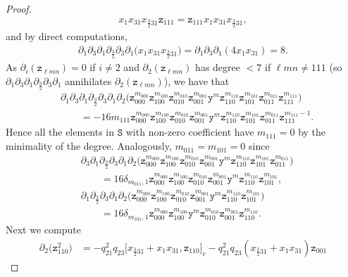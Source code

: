 \documentclass[10pt,a4paper]{amsart}
\numberwithin{equation}{section}
\newcommand{\yt}{\mathtt{y}}
\newcommand{\zt}{\mathtt{z}}
\newcommand{\tresdos}{\frac{3}{2}}
\begin{document}
\begin{proof}
\begin{align*}
x_1x_{31}x_{\tresdos31}\zt_{111}=\zt_{111}x_1x_{31}x_{\tresdos31},
\end{align*}
and by direct computations,
\begin{align*}
\partial_1\partial_3\partial_1\partial_{\tresdos}\partial_3\partial_1\big(x_1x_{31}x_{\tresdos31}\big)=
\partial_1\partial_3\partial_1(4x_1x_{31})=8.
\end{align*}
As $\partial_i(\zt_{\ell mn})=0$ if $i\ne 2$ and $\partial_2(\zt_{\ell mn})$ has degree $<7$ if $\ell mn\ne 111$ (so $\partial_1\partial_3\partial_1\partial_{\tresdos}\partial_3\partial_1$ annihilates $\partial_2(\zt_{\ell mn})$), we have that
\begin{align*}
&\partial_1\partial_3 \partial_1\partial_{\tresdos}\partial_3\partial_1\partial_2\big(\zt_{000}^{m_{000}} \zt_{100}^{m_{100}} \zt_{010}^{m_{010}} \zt_{001}^{m_{001}} \yt^m \zt_{110}^{m_{110}} \zt_{101}^{m_{101}} \zt_{011}^{m_{011}} \zt_{111}^{m_{111}}\big)
\\ &\qquad{} = -16m_{111} \zt_{000}^{m_{000}} \zt_{100}^{m_{100}} \zt_{010}^{m_{010}} \zt_{001}^{m_{001}} \yt^m \zt_{110}^{m_{110}} \zt_{101}^{m_{101}} \zt_{011}^{m_{011}} \zt_{111}^{m_{111}-1}.
\end{align*}
Hence all the elements in $\mathtt{S}$ with non-zero coefficient have $m_{111}=0$ by the minimality of the degree. Analogously, $m_{011}=m_{101}=0$ since
\begin{align*}
& \partial_3 \partial_1\partial_{\tresdos}\partial_3\partial_1\partial_2\big(\zt_{000}^{m_{000}} \zt_{100}^{m_{100}} \zt_{010}^{m_{010}} \zt_{001}^{m_{001}} \yt^m \zt_{110}^{m_{110}} \zt_{101}^{m_{101}} \zt_{011}^{m_{011}}\big)
\\
& \qquad {}=16\delta_{m_{011},1} \zt_{000}^{m_{000}} \zt_{100}^{m_{100}} \zt_{010}^{m_{010}} \zt_{001}^{m_{001}} \yt^m \zt_{110}^{m_{110}} \zt_{101}^{m_{101}},
\\
& \partial_1\partial_{\tresdos}\partial_3\partial_1\partial_2\big(\zt_{000}^{m_{000}} \zt_{100}^{m_{100}} \zt_{010}^{m_{010}} \zt_{001}^{m_{001}} \yt^m \zt_{110}^{m_{110}} \zt_{101}^{m_{101}}\big)
\\
& \qquad {}=16\delta_{m_{101},1} \zt_{000}^{m_{000}} \zt_{100}^{m_{100}} \yt^m \zt_{010}^{m_{010}} \zt_{001}^{m_{001}} \zt_{110}^{m_{110}}.
\end{align*}
Next we compute
\begin{align*}
\partial_2 \big(\zt_{110}^2\big) &= -q_{21}^2q_{23} \big[x_{\tresdos31}+x_1x_{31}, \zt_{110}\big]_c
-q_{21}^2q_{23} (x_{\tresdos31}+x_1x_{31})\zt_{001}

\end{align*}
\end{proof}
\end{document}
